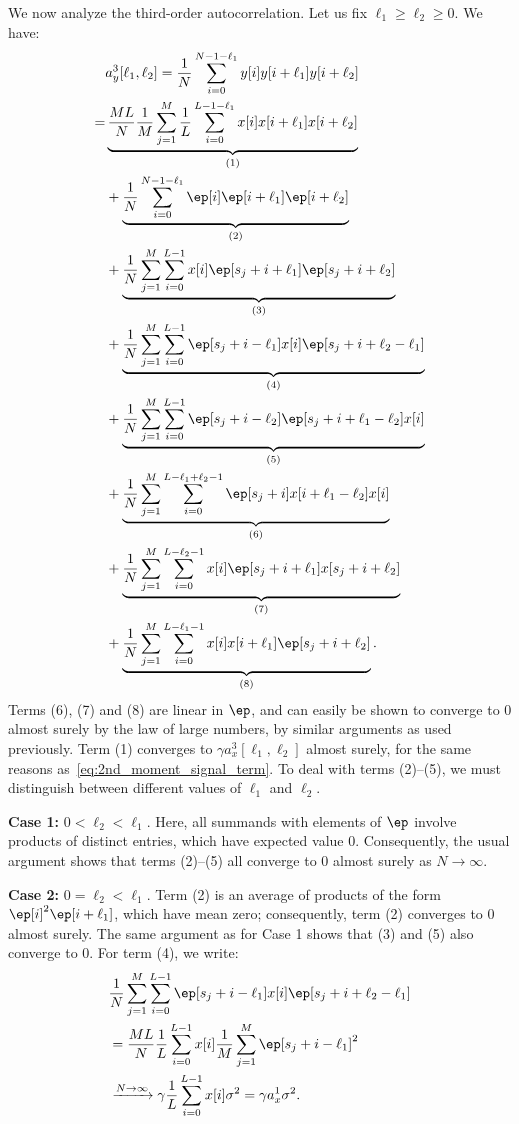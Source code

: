 \documentclass[9pt,twocolumn,twoside,lineno]{pnas-new}
\begin{document}
We now analyze the third-order autocorrelation. Let us fix $\ell_1\geq\ell_2\ge0$. We have:
%
\begin{align}
%
&a_y^3[\ell_1,\ell_2] 
= \frac{1}{N}\sum_{i=0}^{N-1-\ell_1} y[i]y[i+\ell_1]y[i+\ell_2]
\nonumber \\
%
=& \underbrace{ \frac{ML}{N}\frac{1}{M}\sum_{j=1}^M 
	\frac{1}{L}\sum_{i=0}^{L-1-\ell_1}x[i]x[i+\ell_1]x[i+\ell_2]   }_{(1)}
\\& + \underbrace{\frac{1}{N}\sum_{i=0}^{N-1-\ell_1} \ep[i]\ep[i+\ell_1]\ep[i+\ell_2]}_{(2)}
\nonumber \\
&+ \underbrace{\frac{1}{N}\sum_{j=1}^{M} 
	\sum_{i=0}^{L-1} x[i]\ep[s_j + i+\ell_1]\ep[s_j+ i+\ell_2]}_{(3)}
\\& + \underbrace{\frac{1}{N}\sum_{j=1}^{M} 
	\sum_{i=0}^{L-1} \ep[s_j+i-\ell_1]x[i]\ep[s_j+ i+\ell_2-\ell_1]}_{(4)}
\nonumber \\
&+ \underbrace{\frac{1}{N}\sum_{j=1}^{M} 
	\sum_{i=0}^{L-1} \ep[s_j+i-\ell_2]\ep[s_j+i+\ell_1-\ell_2]x[i]}_{(5)}
\\ & + \underbrace{\frac{1}{N}\sum_{j=1}^{M} 
	\sum_{i=0}^{L-\ell_1+\ell_2-1} \ep[s_j+i]x[i+\ell_1-\ell_2]x[i]}_{(6)}
\nonumber \\
&+ \underbrace{\frac{1}{N}\sum_{j=1}^{M} 
	\sum_{i=0}^{L-\ell_2-1} x[i]\ep[s_j + i+\ell_1]x[s_j+ i+\ell_2]}_{(7)}
\\ & + \underbrace{\frac{1}{N}\sum_{j=1}^{M} 
	\sum_{i=0}^{L-\ell_1-1} x[i]x[i+\ell_1]\ep[s_j+ i+\ell_2]}_{(8)}.
%
\end{align}
%
Terms (6), (7) and (8) are linear in $\ep$, and can easily be shown to converge to 0 almost surely by the law of large numbers, by similar arguments as used previously. Term (1) converges to $\gamma a_x^3[\ell_1,\ell_2]$ almost surely, for the same reasons as~\eqref{eq:2nd_moment_signal_term}. To deal with terms (2)--(5), we must distinguish between different values of $\ell_1$ and $\ell_2$.

{\bf Case 1:} $0 < \ell_2 < \ell_1$. Here, all summands with elements of $\ep$ involve products of distinct entries, which have expected value 0. Consequently, the usual argument shows that terms (2)--(5) all converge to 0 almost surely as $N \to \infty$.

{\bf Case 2:} $0=\ell_2 < \ell_1$. Term (2) is an average of products of the form $\ep[i]^2\ep[i+\ell_1]$, which have mean zero; consequently, term (2) converges to 0 almost surely. The same argument as for Case 1 shows that (3) and (5) also converge to 0. For term (4), we write:
%
\begin{align}
%
&\frac{1}{N}\sum_{j=1}^{M} 
\sum_{i=0}^{L-1} \ep[s_j+i-\ell_1]x[i]\ep[s_j+ i+\ell_2-\ell_1]
\nonumber \\
&= \frac{ML}{N}\frac{1}{L}\sum_{i=0}^{L-1}x[i] \frac{1}{M}\sum_{j=1}^{M} \ep[s_j+i-\ell_1]^2
\\& \xrightarrow{N\to\infty} \gamma \frac{1}{L} \sum_{i=0}^{L-1}x[i] \sigma^2 = \gamma a_x^1 \sigma^2. \nonumber
%
\end{align}
\end{document}
